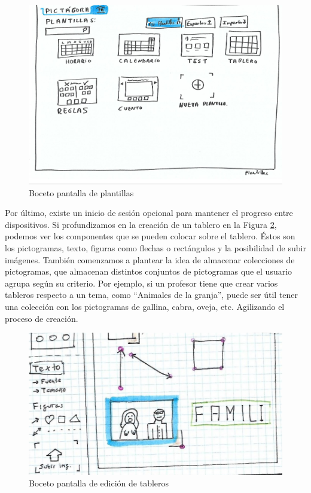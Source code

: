 \begin{figure}[h!]
	\centering
	\includegraphics[width=0.7\linewidth]{Imagenes/Bitmap/inicioAlfonso}
	\caption{Boceto pantalla de plantillas}
	\label{fig:inicioalfonso}
\end{figure}


Por último, existe un inicio de sesión opcional para mantener el progreso entre dispositivos. Si profundizamos en la creación de un tablero en la Figura \ref{fig:dibujolibrealfon}, podemos ver los componentes que se pueden colocar sobre el tablero. Éstos son los pictogramas, texto, figuras como flechas o rectángulos y la posibilidad de subir imágenes. También comenzamos a plantear la idea de almacenar colecciones de pictogramas, que almacenan distintos conjuntos de pictogramas que el usuario agrupa según su criterio. Por ejemplo, si un profesor tiene que crear varios tableros respecto a un tema, como “Animales de la granja”, puede ser útil tener una colección con los pictogramas de gallina, cabra, oveja, etc. Agilizando el proceso de creación.

\begin{figure}[h!]
	\centering
	\includegraphics[width=0.7\linewidth]{Imagenes/Bitmap/DibujoLibreAlfon}
	\caption{Boceto pantalla de edición de tableros }
	\label{fig:dibujolibrealfon}
\end{figure}

